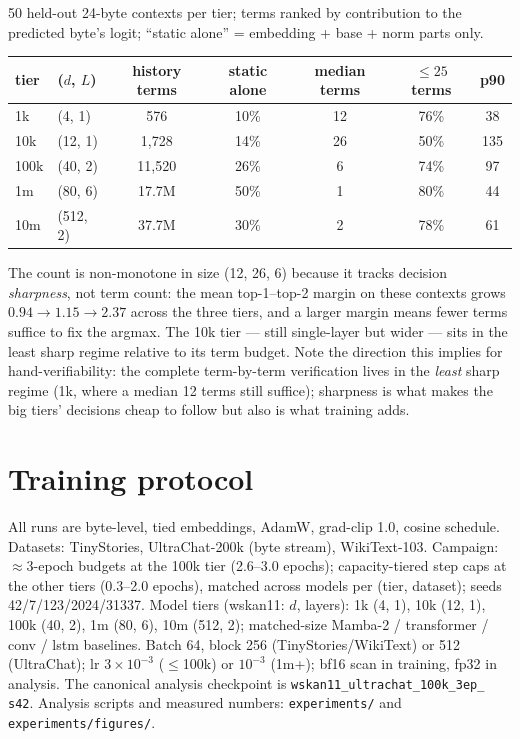 \documentclass[11pt]{article}
\begin{document}
50 held-out 24-byte contexts per tier; terms ranked by contribution to the
predicted byte's logit; ``static alone'' = embedding + base + norm parts
only.

\begin{center}
\begin{tabular}{llccccc}
\toprule
tier & ($d$, $L$) & history terms & static alone & median terms & $\le 25$ terms & p90 \\
\midrule
1k & (4, 1) & 576 & 10\% & 12 & 76\% & 38 \\
10k & (12, 1) & 1{,}728 & 14\% & 26 & 50\% & 135 \\
100k & (40, 2) & 11{,}520 & 26\% & 6 & 74\% & 97 \\
1m & (80, 6) & 17.7M & 50\% & 1 & 80\% & 44 \\
10m & (512, 2) & 37.7M & 30\% & 2 & 78\% & 61 \\
\bottomrule
\end{tabular}
\end{center}

The count is non-monotone in size (12, 26, 6) because it tracks decision
\emph{sharpness}, not term count: the mean top-1--top-2 margin on these
contexts grows $0.94 \to 1.15 \to 2.37$ across the three tiers, and a
larger margin means fewer terms suffice to fix the argmax. The 10k tier
--- still single-layer but wider --- sits in the least sharp regime
relative to its term budget. Note the direction this implies for
hand-verifiability: the complete term-by-term verification lives in the
\emph{least} sharp regime (1k, where a median 12 terms still suffice);
sharpness is what makes the big tiers' decisions cheap to follow but also
is what training adds.

\section{Training protocol}

All runs are byte-level, tied embeddings, AdamW, grad-clip 1.0, cosine
schedule. Datasets: TinyStories, UltraChat-200k (byte stream), WikiText-103.
Campaign: $\approx$3-epoch budgets at the 100k tier (2.6--3.0 epochs);
capacity-tiered step caps at the other tiers (0.3--2.0 epochs), matched
across models per (tier, dataset); seeds 42/7/123/2024/31337.
Model tiers (wskan11: $d$, layers): 1k (4, 1), 10k (12, 1), 100k (40, 2),
1m (80, 6), 10m (512, 2); matched-size Mamba-2 / transformer / conv / lstm
baselines. Batch 64, block 256 (TinyStories/WikiText) or 512 (UltraChat);
lr $3{\times}10^{-3}$ ($\le$100k) or $10^{-3}$ (1m+); bf16 scan in
training, fp32 in analysis. The canonical analysis checkpoint is
\texttt{wskan11\_ultrachat\_100k\_3ep\_} \texttt{s42}. Analysis scripts
and measured numbers: \texttt{experiments/} and
\texttt{experiments/figures/}.
\end{document}
